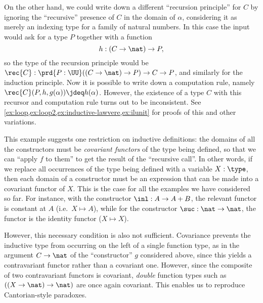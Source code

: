 On the other hand, we could write down a different ``recursion principle'' for $C$ by ignoring the ``recursive'' presence of $C$ in the domain of $\alpha$, considering it as merely an indexing type for a family of natural numbers.
In this case the input would ask for a type $P$ together with a function
\begin{equation*}
  h:(C\to \nat) \to P,
\end{equation*}
so the type of the recursion principle would be $\rec{C}:\prd{P:\UU} ((C\to \nat) \to P) \to C\to P$, and similarly for the induction principle.
Now it is possible to write down a computation rule, namely $\rec{C}(P,h,g(\alpha))\jdeq h(\alpha)$.
However, the existence of a type $C$ with this recursor and computation rule turns out to be inconsistent.
See \cref{ex:loop,ex:loop2,ex:inductive-lawvere,ex:ilunit} for proofs of this and other variations.

This example suggests one restriction on inductive definitions: the domains of all the constructors must be \emph{covariant functors} of the type being defined, so that we can ``apply $f$ to them'' to get the result of the ``recursive call''.
In other words, if we replace all occurrences of the type being defined with a variable
%
$X:\type$, then each domain of a constructor
%
must be an expression that can be made into a covariant functor of $X$.
This is the case for all the examples we have considered so far.
For instance, with the constructor $\inl:A\to A+B$, the relevant functor is constant at $A$ (i.e.\ $X\mapsto A$), while for the constructor $\suc:\nat\to\nat$, the functor is the identity functor ($X\mapsto X$).

However, this necessary condition is also not sufficient.
Covariance prevents the inductive type from occurring on the left of a single function type, as in the argument $C\to\nat$ of the ``constructor'' $g$ considered above, since this yields a contravariant functor rather than a covariant one.
However, since the composite of two contravariant functors is covariant, \emph{double} function types such as $((X\to \nat)\to \nat)$ are once again covariant.
This enables us to reproduce Cantorian-style paradoxes.

